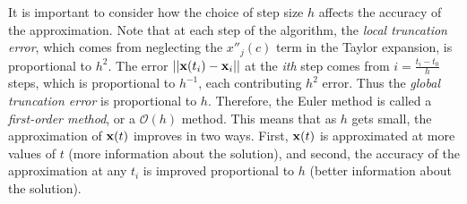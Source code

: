 It is important to consider how the choice of step size $h$ affects the accuracy of the approximation. Note that at each step of the algorithm, the \textit{local truncation error}, which comes from neglecting the $x''_j(c)$ term in the Taylor expansion, is proportional to $h^2$.
The error $||\mathbf{x}(t_i)-\mathbf{x}_i||$ at the \textit{ith} step comes from $i = \frac{t_i-t_0}{h}$ steps, which is proportional to $h^{-1}$, each contributing $h^2$ error.
Thus the \textit{global truncation error} is proportional to $h$.
Therefore, the Euler method is called a \textit{first-order method}, or a $\mathcal{O}(h)$ method.
This means that as $h$ gets small, the approximation of $\mathbf{x}(t)$ improves in two ways.
First, $\mathbf{x}(t)$ is approximated at more values of $t$ (more information about the solution), and second, the accuracy of the approximation at any $t_i$ is improved proportional to $h$ (better information about the solution).


